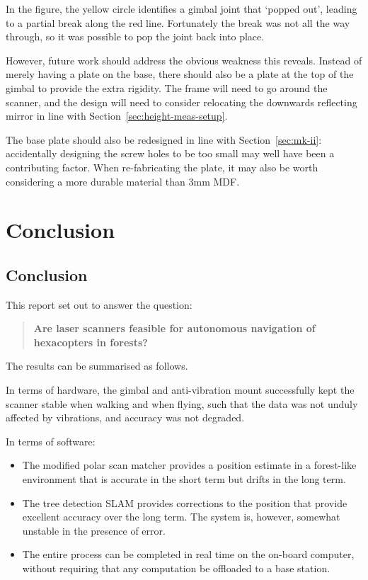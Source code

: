 \documentclass[12pt,oneside,a4paper,draft]{book}
\begin{document}
In the figure, the yellow circle identifies a gimbal joint that
`popped out', leading to a partial break along the red
line. Fortunately the break was not all the way through, so it was
possible to pop the joint back into place.

However, future work should address the obvious weakness this
reveals. Instead of merely having a plate on the base, there should
also be a plate at the top of the gimbal to provide the extra
rigidity. The frame will need to go around the scanner, and the design
will need to consider relocating the downwards reflecting mirror in
line with Section~\ref{sec:height-meas-setup}.

The base plate should also be redesigned in line with
Section~\ref{sec:mk-ii}: accidentally designing the screw holes to be
too small may well have been a contributing factor. When re-fabricating
the plate, it may also be worth considering a more durable material
than 3mm MDF.

\part{Conclusion}
\chapter{Conclusion}
\label{cha:conclusion}


This report set out to answer the question: 
\begin{quote}
  \textbf{Are laser scanners feasible for autonomous navigation of
    hexacopters in forests?}
\end{quote}

The results can be summarised as follows.

In terms of hardware, the gimbal and anti-vibration mount successfully
kept the scanner stable when walking and when flying, such that the
data was not unduly affected by vibrations, and accuracy was not
degraded.

In terms of software:
\begin{itemize}
\item The modified polar scan matcher provides a position estimate in
  a forest-like environment that is accurate in the short term but
  drifts in the long term.
\item The tree detection SLAM provides corrections to the position
  that provide excellent accuracy over the long term. The system is,
  however, somewhat unstable in the presence of error.
\item The entire process can be completed in real time on the on-board
  computer, without requiring that any computation be offloaded to a
  base station.
\end{itemize}
\end{document}

